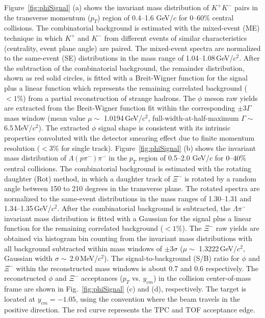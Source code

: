 \documentclass[aps,tightenlines,superscriptaddress,twocolumn]{revtex4-1}
\begin{document}
Figure~\ref{fig:phiSignal} (a) shows the invariant mass distribution of $K^+K^-$ pairs in the transverse momentum ($p_{T}$) region of 0.4--1.6 GeV/$c$ for 0--60\% central collisions. The combinatorial background is estimated with the mixed-event (ME) technique in which $K^+$ and $K^-$ from different events of similar characteristics (centrality, event plane angle) are paired. The mixed-event spectra are normalized to the same-event (SE) distributions in the mass range of 1.04--1.08\,GeV/$c^2$. After the subtraction of the combinatorial background, the remainder distribution, shown as red solid circles, 
is fitted with a Breit-Wigner function for the signal plus a linear function which represents the remaining correlated background ($< 1\%$) from a partial reconstruction of strange hadrons. The $\phi$ meson raw yields are extracted from the Breit-Wigner function fit within the corresponding $\pm$3$\Gamma$ mass window (mean value $\mu\sim$ 1.0194\,GeV/$c^2$, full-width-at-half-maximum $\Gamma\sim$ 6.5\,MeV/$c^2$). The extracted $\phi$ signal shape is consistent with its intrinsic properties convoluted with the detector smearing effect due to finite momentum resolution ($<3\%$ for single track).
Figure~\ref{fig:phiSignal} (b) shows the invariant mass distribution of $\Lambda(p\pi^-)\pi^-$ in the $p_{T}$ region of 0.5--2.0 GeV/$c$ for $\textup{0--40\%}$ central collisions. The combinatorial background is estimated with the rotating daughter (Rot) method, in which a daughter track of $\Xi^-$ is rotated by a random angle between 150 to 210 degrees in the transverse plane. The rotated spectra are normalized to the same-event distributions in the mass ranges of 1.30--1.31 and 1.34--1.35\,GeV/$c^2$. After the combinatorial background is subtracted, the $\Lambda\pi^-$ invariant mass distribution is fitted with a Gaussian for the signal plus a linear function for the remaining correlated background ($< 1\%$). The $\Xi^-$ raw yields are obtained via histogram bin counting from the invariant mass distributions with all background subtracted within mass windows of $\pm$3$\sigma$ ($\mu\sim$ 1.3222\,GeV/$c^2$, Gaussian width $\sigma\sim$\,2.0\,MeV/$c^2$). The signal-to-background (S/B) ratio for $\phi$ and $\Xi^-$ within the reconstructed mass windows is about 0.7 and 0.6 respectively. The reconstructed $\phi$ and $\Xi^-$ acceptances ($p_T$ vs. $y_{cm}$) in the collision center-of-mass frame are shown in Fig.~\ref{fig:phiSignal} (c) and (d), respectively.
The target is located at $y_{cm} = -1.05$, using the convention where the beam travels in the positive direction. The red curve represents the TPC and TOF acceptance edge. %
\end{document}
